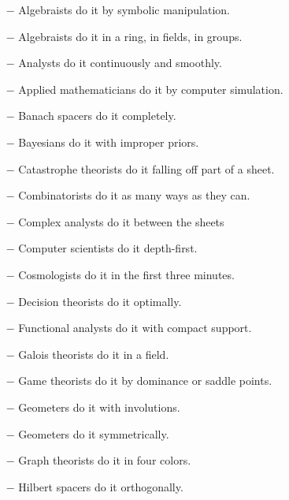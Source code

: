 	\begin{itemize}	 
		\item[$-$] Algebraists do it by symbolic manipulation.
	
		\item[$-$] Algebraists do it in a ring, in fields, in groups.
	
		\item[$-$] Analysts do it continuously and smoothly.
	
		\item[$-$] Applied mathematicians do it by computer simulation.
	
		\item[$-$] Banach spacers do it completely.
	
		\item[$-$] Bayesians do it with improper priors.
	
		\item[$-$] Catastrophe theorists do it falling off part of a sheet.
	
		\item[$-$] Combinatorists do it as many ways as they can.
	
		\item[$-$] Complex analysts do it between the sheets
	
		\item[$-$] Computer scientists do it depth-first.
	
		\item[$-$] Cosmologists do it in the first three minutes.
	
		\item[$-$] Decision theorists do it optimally.
	
		\item[$-$] Functional analysts do it with compact support.
	
		\item[$-$] Galois theorists do it in a field.
	
		\item[$-$] Game theorists do it by dominance or saddle points.
	
		\item[$-$] Geometers do it with involutions.
	
		\item[$-$] Geometers do it symmetrically.
	
		\item[$-$] Graph theorists do it in four colors.
	
		\item[$-$] Hilbert spacers do it orthogonally.
	

\end{itemize}
